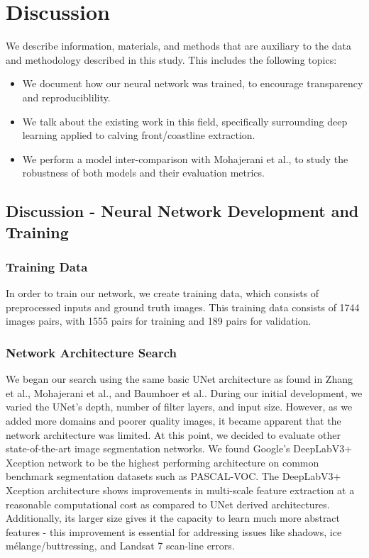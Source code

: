 \documentclass[tc, manuscript]{copernicus}
\begin{document}
\section{Discussion}
We describe information, materials, and methods that are auxiliary to the data and methodology described in this study. This includes the following topics:
\begin{itemize}
    \item We document how our neural network was trained, to encourage transparency and reproduciblility.
    \item We talk about the existing work in this field, specifically surrounding deep learning applied to calving front/coastline extraction.
    \item We perform a model inter-comparison with Mohajerani et al., to study the robustness of both models and their evaluation metrics.
\end{itemize}

\subsection{Discussion - Neural Network Development and Training}
\subsubsection{Training Data}
In order to train our network, we create training data, which consists of preprocessed inputs and ground truth images. This training data consists of 1744 images pairs, with 1555 pairs for training and 189 pairs for validation. 
\subsubsection{Network Architecture Search}
We began our search using the same basic UNet architecture as found in Zhang et al.\citep{zhang2019}, Mohajerani et al.\citep{mohajerani2019}, and Baumhoer et al.\citep{baumhoer2019}. During our initial development, we varied the UNet's depth, number of filter layers, and input size. However, as we added more domains and poorer quality images, it became apparent that the network architecture was limited. 
At this point, we decided to evaluate other state-of-the-art image segmentation networks. We found Google's DeepLabV3+ Xception network to be the highest performing architecture on common benchmark segmentation datasets such as PASCAL-VOC. The DeepLabV3+ Xception architecture shows improvements in multi-scale feature extraction at a reasonable computational cost as compared to UNet derived architectures. Additionally, its larger size gives it the capacity to learn much more abstract features - this improvement is essential for addressing issues like shadows, ice mélange/buttressing, and Landsat 7 scan-line errors.
\end{document}
